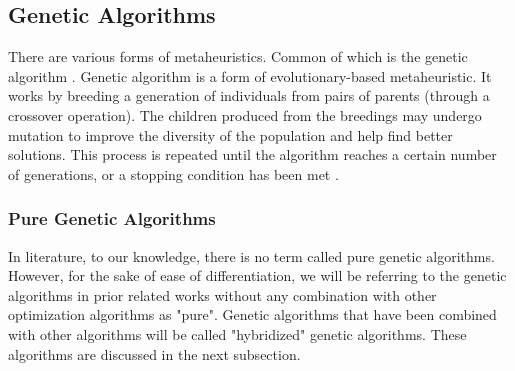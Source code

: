 \subsection{Genetic Algorithms}

There are various forms of metaheuristics. Common of which is the genetic algorithm \cite{Hosseini-Nasab2018}. Genetic algorithm is a form of evolutionary-based metaheuristic. It works by breeding a generation of individuals from pairs of parents (through a crossover operation). The children produced from the breedings may undergo mutation to improve the diversity of the population and help find better solutions. This process is repeated until the algorithm reaches a certain number of generations, or a stopping condition has been met \cite{Luke2013Metaheuristics}.

\subsubsection{Pure Genetic Algorithms}
In literature, to our knowledge, there is no term called pure genetic algorithms. However, for the sake of ease of differentiation, we will be referring to the genetic algorithms in prior related works without any combination with other optimization algorithms as "pure". Genetic algorithms that have been combined with other algorithms will be called "hybridized" genetic algorithms. These algorithms are discussed in the next subsection.

